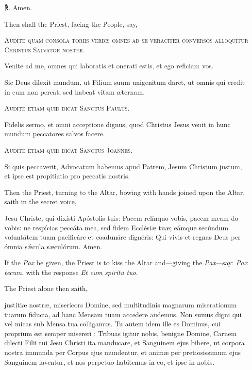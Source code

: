 ℟. Amen.
\begin{rubric}
Then shall the Priest, facing the People, say,
\end{rubric}\noindent
\begin{center}
	\textsc{Audite quam consola toriis verbis omnes ad se veraciter conversos alloquitur Christus Salvator noster.}
\end{center}
\par\noindent
Venite ad me, omnes qui laboratis et onerati estis, et ego reficiam vos. 
\par\noindent
    Sic Deus dilexit mundum, ut Filium suum unigenitum daret, ut omnis qui credit in eum non pereat, sed habeat vitam æternam. 
    \par\noindent
    \begin{center}
		\textsc{Audite etiam quid dicat Sanctus Paulus.}
	\end{center}
\par\noindent
    Fidelis sermo, et omni acceptione dignus, quod Christus Jesus venit in hunc mundum peccatores salvos facere. 
\par\noindent
    \begin{center}
		\textsc{Audite etiam quid dicat Sanctus Joannes.}
	\end{center}
    \par\noindent
    Si quis peccaverit, Advocatum habemus apud Patrem, Jesum Christum justum, et ipse est propitiatio pro peccatis nostris. 
\begin{rubric}
    Then the Priest, turning to the Altar, bowing with hands joined upon the Altar, saith in the secret voice,
\end{rubric}
 Jesu Christe, qui dixísti Apóstolis tuis: Pacem relínquo vobis, pacem meam do vobis: ne respícias peccáta mea, sed fidem Ecclésiæ tuæ; eámque secúndum voluntátem tuam pacificáre et coadunáre dignéris: Qui vivis et regnas Deus per ómnia sǽcula sæculórum. Amen.
\begin{rubric}
    If the \emph{Pax} be given, the Priest is to kiss the Altar and---giving the \emph{Pax}---say: \emph{Pax tecum.} with the response \emph{Et cum spiritu tuo.}
\end{rubric}
\begin{rubric}
    The Priest alone then saith,
\end{rubric}
 justitiæ nostræ, misericors Domine, sed multitudinis magnarum miserationum tuarum fiducia, ad hanc Mensam tuam accedere audemus. Non sumus digni qui vel micas sub Mensa tua colligamus. Tu autem idem ille es Dominus, cui proprium est semper misereri : Tribuas igitur nobis, benigne Domine, Carnem dilecti Filii tui Jesu Christi ita manducare, et Sanguinem ejus bibere, ut corpora nostra immunda per Corpus ejus mundentur, et animæ per pretiosissimum ejus Sanguinem laventur, et nos perpetuo habitemus in eo, et ipse in nobis.\par
